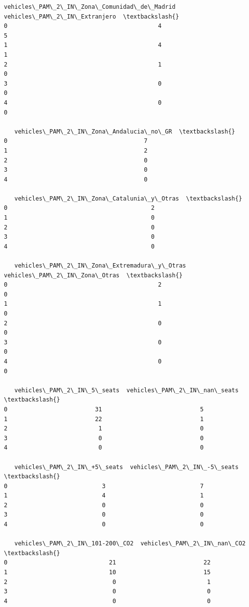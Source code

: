 \documentclass[11pt]{article}
\begin{document}
\begin{tcolorbox}[breakable, size=fbox, boxrule=.5pt, pad at break*=1mm, opacityfill=0]
\begin{Verbatim}[commandchars=\\\{\}]
   vehicles\_PAM\_2\_IN\_Zona\_Comunidad\_de\_Madrid  vehicles\_PAM\_2\_IN\_Extranjero  \textbackslash{}
0                                           4                             5
1                                           4                             1
2                                           1                             0
3                                           0                             0
4                                           0                             0

   vehicles\_PAM\_2\_IN\_Zona\_Andalucia\_no\_GR  \textbackslash{}
0                                       7
1                                       2
2                                       0
3                                       0
4                                       0

   vehicles\_PAM\_2\_IN\_Zona\_Catalunia\_y\_Otras  \textbackslash{}
0                                         2
1                                         0
2                                         0
3                                         0
4                                         0

   vehicles\_PAM\_2\_IN\_Zona\_Extremadura\_y\_Otras  vehicles\_PAM\_2\_IN\_Zona\_Otras  \textbackslash{}
0                                           2                             0
1                                           1                             0
2                                           0                             0
3                                           0                             0
4                                           0                             0

   vehicles\_PAM\_2\_IN\_5\_seats  vehicles\_PAM\_2\_IN\_nan\_seats  \textbackslash{}
0                         31                            5
1                         22                            1
2                          1                            0
3                          0                            0
4                          0                            0

   vehicles\_PAM\_2\_IN\_+5\_seats  vehicles\_PAM\_2\_IN\_-5\_seats  \textbackslash{}
0                           3                           7
1                           4                           1
2                           0                           0
3                           0                           0
4                           0                           0

   vehicles\_PAM\_2\_IN\_101-200\_CO2  vehicles\_PAM\_2\_IN\_nan\_CO2  \textbackslash{}
0                             21                         22
1                             10                         15
2                              0                          1
3                              0                          0
4                              0                          0


\end{Verbatim}
\end{tcolorbox}
\end{document}
